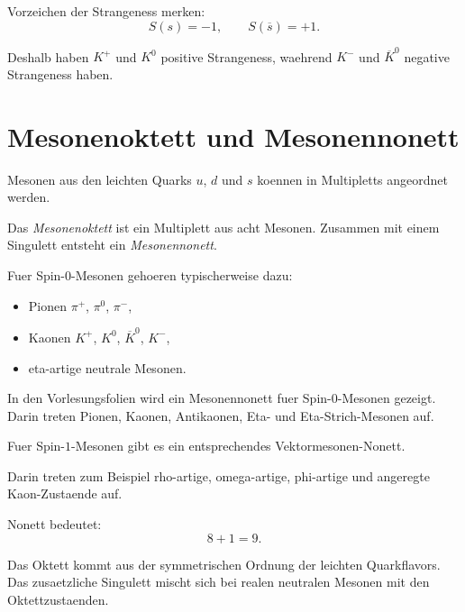 \begin{examtipbox}
Vorzeichen der Strangeness merken:
\[
    S(s)=-1,
    \qquad
    S(\overline{s})=+1.
\]

Deshalb haben $K^+$ und $K^0$ positive Strangeness, waehrend $K^-$ und
$\overline{K}^0$ negative Strangeness haben.
\end{examtipbox}

\section{Mesonenoktett und Mesonennonett}

Mesonen aus den leichten Quarks $u$, $d$ und $s$ koennen in Multipletts angeordnet
werden.

\begin{definitionbox}
Das \emph{Mesonenoktett} ist ein Multiplett aus acht Mesonen.
Zusammen mit einem Singulett entsteht ein \emph{Mesonennonett}.
\end{definitionbox}

\begin{conceptbox}
Fuer Spin-$0$-Mesonen gehoeren typischerweise dazu:
\begin{itemize}
    \item Pionen $\pi^+$, $\pi^0$, $\pi^-$,
    \item Kaonen $K^+$, $K^0$, $\overline{K}^0$, $K^-$,
    \item eta-artige neutrale Mesonen.
\end{itemize}
\end{conceptbox}

\begin{notebox}
In den Vorlesungsfolien wird ein Mesonennonett fuer Spin-$0$-Mesonen gezeigt.
Darin treten Pionen, Kaonen, Antikaonen, Eta- und Eta-Strich-Mesonen auf.
\end{notebox}

\begin{conceptbox}
Fuer Spin-$1$-Mesonen gibt es ein entsprechendes Vektormesonen-Nonett.

Darin treten zum Beispiel rho-artige, omega-artige, phi-artige und angeregte
Kaon-Zustaende auf.
\end{conceptbox}

\begin{examtipbox}
Nonett bedeutet:
\[
    8+1=9.
\]

Das Oktett kommt aus der symmetrischen Ordnung der leichten Quarkflavors.
Das zusaetzliche Singulett mischt sich bei realen neutralen Mesonen mit den
Oktettzustaenden.
\end{examtipbox}

